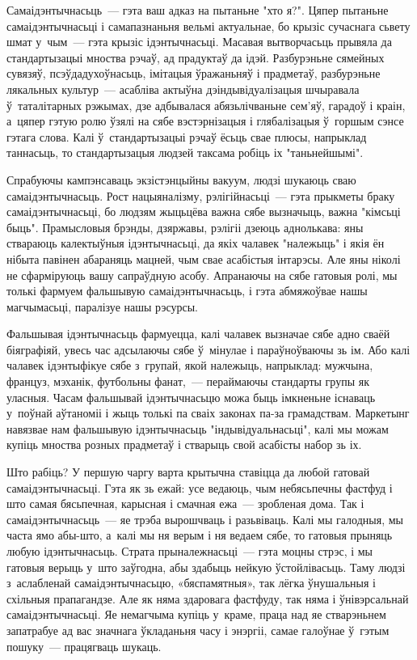 Самаідэнтычнасьць~--- гэта ваш адказ на пытаньне "хто я?". Цяпер пытаньне самаідэнтычнасьці і самапазнаньня вельмі актуальнае, бо крызіс сучаснага сьвету шмат у~чым~--- гэта крызіс ідэнтычнасьці. Масавая вытворчасьць прывяла да стандартызацыі мноства рэчаў, ад прадуктаў да ідэй. Разбурэньне сямейных сувязяў, псэўдадухоўнасьць, імітацыя ўражаньняў і прадметаў, разбурэньне лякальных культур~--- асабліва актыўна дэіндывідуалізацыя шчыравала ў~таталітарных рэжымах, дзе адбывалася абязьлічваньне сем'яў, гарадоў і краін, а~цяпер гэтую ролю ўзялі на сябе вэстэрнізацыя і глябалізацыя ў~горшым сэнсе гэтага слова. Калі ў~стандартызацыі рэчаў ёсьць свае плюсы, напрыклад таннасьць, то стандартызацыя людзей таксама робіць іх "таньнейшымі".

Спрабуючы кампэнсаваць экзістэнцыйны вакуум, людзі шукаюць сваю самаідэнтычнасьць. Рост нацыяналізму, рэлігійнасьці~--- гэта прыкметы браку самаідэнтычнасьці, бо людзям жыцьцёва важна сябе вызначыць, важна "кімсьці быць". Прамысловыя брэнды, дзяржавы, рэлігіі дзеюць аднолькава: яны ствараюць калектыўныя ідэнтычнасьці, да якіх чалавек "належыць" і якія ён нібыта павінен абараняць мацней, чым свае асабістыя інтарэсы. Але яны ніколі не сфарміруюць вашу сапраўдную асобу. Апранаючы на сябе гатовыя ролі, мы толькі фармуем фальшывую самаідэнтычнасьць, і гэта абмяжоўвае нашы магчымасьці, паралізуе нашы рэсурсы.

Фальшывая ідэнтычнасьць фармуецца, калі чалавек вызначае сябе адно сваёй біяграфіяй, увесь час адсылаючы сябе ў~мінулае і параўноўваючы зь ім. Або калі чалавек ідэнтыфікуе сябе з~групай, якой належыць, напрыклад: мужчына, француз, мэханік, футбольны фанат,~--- пераймаючы стандарты групы як уласныя. Часам фальшывай ідэнтычнасьцю можа быць імкненьне існаваць у~поўнай аўтаноміі і жыць толькі па сваіх законах па-за грамадствам. Маркетынг навязвае нам фальшывую ідэнтычнасьць "індывідуальнасьці", калі мы можам купіць мноства розных прадметаў і стварыць свой асабісты набор зь іх.

Што рабіць? У першую чаргу варта крытычна ставіцца да любой гатовай самаідэнтычнасьці. Гэта як зь ежай: усе ведаюць, чым небясьпечны фастфуд і што самая бясьпечная, карысная і смачная ежа~--- зробленая дома. Так і самаідэнтычнасьць~--- яе трэба вырошчваць і разьвіваць. Калі мы галодныя, мы часта ямо абы-што, а~калі мы ня верым і ня ведаем сябе, то гатовыя прыняць любую ідэнтычнасьць. Страта прыналежнасьці~--- гэта моцны стрэс, і мы гатовыя верыць у~што заўгодна, абы здабыць нейкую ўстойлівасьць. Таму людзі з~аслабленай самаідэнтычнасьцю, «бяспамятныя», так лёгка ўнушальныя і схільныя прапагандзе. Але як няма здаровага фастфуду, так няма і ўнівэрсальнай самаідэнтычнасьці. Яе немагчыма купіць у~краме, праца над яе стварэньнем запатрабуе ад вас значнага ўкладаньня часу і энэргіі, самае галоўнае ў~гэтым пошуку~--- працягваць шукаць.

